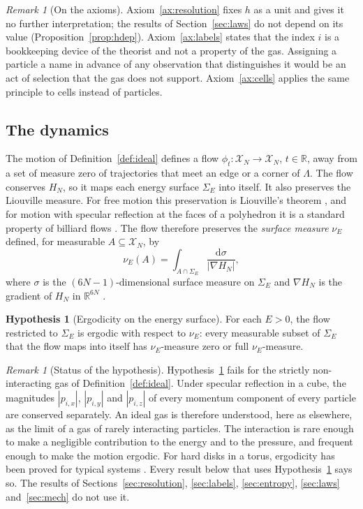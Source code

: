 \documentclass[11pt,a4paper]{article}
\theoremstyle{definition}
\newtheorem{hypothesis}{Hypothesis}
\theoremstyle{remark}
\newtheorem{remark}[theorem]{Remark}
\newcommand{\R}{\mathbb{R}}
\newcommand{\X}{\mathcal{X}}
\newcommand{\dd}{\mathrm{d}}
\begin{document}
\begin{remark}[On the axioms]
\label{rem:axioms}
Axiom~\ref{ax:resolution} fixes $h$ as a unit and gives it no further interpretation; the results of Section~\ref{sec:laws} do not depend on its value (Proposition~\ref{prop:hdep}).
Axiom~\ref{ax:labels} states that the index $i$ is a bookkeeping device of the theorist and not a property of the gas.
Assigning a particle a name in advance of any observation that distinguishes it would be an act of selection that the gas does not support.
Axiom~\ref{ax:cells} applies the same principle to cells instead of particles.
\end{remark}

\subsection{The dynamics}

The motion of Definition~\ref{def:ideal} defines a flow $\phi_t\colon\X_N\to\X_N$, $t\in\R$, away from a set of measure zero of trajectories that meet an edge or a corner of $\Lambda$.
The flow conserves $H_N$, so it maps each energy surface $\Sigma_E$ into itself.
It also preserves the Liouville measure.
For free motion this preservation is Liouville's theorem \citep{arnold1989}, and for motion with specular reflection at the faces of a polyhedron it is a standard property of billiard flows \citep{chernov2006}.
The flow therefore preserves the \emph{surface measure} $\nu_E$ defined, for measurable $A\subseteq\X_N$, by
\begin{equation}
\nu_E(A)=\int_{A\cap\Sigma_E}\frac{\dd\sigma}{|\nabla H_N|},
\label{eq:surface-measure}
\end{equation}
where $\sigma$ is the $(6N-1)$-dimensional surface measure on $\Sigma_E$ and $\nabla H_N$ is the gradient of $H_N$ in $\R^{6N}$ \citep{khinchin1949}.

\begin{hypothesis}[Ergodicity on the energy surface]
\label{hyp:ergodic}
For each $E>0$, the flow restricted to $\Sigma_E$ is ergodic with respect to $\nu_E$: every measurable subset of $\Sigma_E$ that the flow maps into itself has $\nu_E$-measure zero or full $\nu_E$-measure.
\end{hypothesis}

\begin{remark}[Status of the hypothesis]
\label{rem:ergodic-status}
Hypothesis~\ref{hyp:ergodic} fails for the strictly non-interacting gas of Definition~\ref{def:ideal}.
Under specular reflection in a cube, the magnitudes $|p_{i,x}|$, $|p_{i,y}|$ and $|p_{i,z}|$ of every momentum component of every particle are conserved separately.
An ideal gas is therefore understood, here as elsewhere, as the limit of a gas of rarely interacting particles.
The interaction is rare enough to make a negligible contribution to the energy and to the pressure, and frequent enough to make the motion ergodic.
For hard disks in a torus, ergodicity has been proved for typical systems \citep{simanyi2003}.
Every result below that uses Hypothesis~\ref{hyp:ergodic} says so.
The results of Sections~\ref{sec:resolution}, \ref{sec:labels}, \ref{sec:entropy}, \ref{sec:laws} and~\ref{sec:mech} do not use it.
\end{remark}
\end{document}
